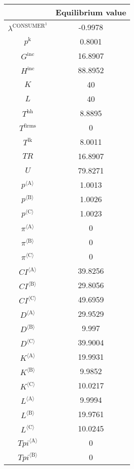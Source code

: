 \begin{tabular}{c|c|}
  & Equilibrium value\\
\hline
$\lambda^{\mathrm{CONSUMER}^{\mathrm{1}}}$ & -0.9978 \\
$p^{\mathrm{k}}$ & 0.8001 \\
$G^{\mathrm{inc}}$ & 16.8907 \\
$H^{\mathrm{inc}}$ & 88.8952 \\
$K$ & 40 \\
$L$ & 40 \\
$T^{\mathrm{hh}}$ & 8.8895 \\
$T^{\mathrm{firms}}$ & 0 \\
$T^{\mathrm{lk}}$ & 8.0011 \\
${T\!R}$ & 16.8907 \\
$U$ & 79.8271 \\
${p}^{\langle \mathrm{A}\rangle}$ & 1.0013 \\
${p}^{\langle \mathrm{B}\rangle}$ & 1.0026 \\
${p}^{\langle \mathrm{C}\rangle}$ & 1.0023 \\
${\pi}^{\langle \mathrm{A}\rangle}$ & 0 \\
${\pi}^{\langle \mathrm{B}\rangle}$ & 0 \\
${\pi}^{\langle \mathrm{C}\rangle}$ & 0 \\
${{C\!I}}^{\langle \mathrm{A}\rangle}$ & 39.8256 \\
${{C\!I}}^{\langle \mathrm{B}\rangle}$ & 29.8056 \\
${{C\!I}}^{\langle \mathrm{C}\rangle}$ & 49.6959 \\
${D}^{\langle \mathrm{A}\rangle}$ & 29.9529 \\
${D}^{\langle \mathrm{B}\rangle}$ & 9.997 \\
${D}^{\langle \mathrm{C}\rangle}$ & 39.9004 \\
${K}^{\langle \mathrm{A}\rangle}$ & 19.9931 \\
${K}^{\langle \mathrm{B}\rangle}$ & 9.9852 \\
${K}^{\langle \mathrm{C}\rangle}$ & 10.0217 \\
${L}^{\langle \mathrm{A}\rangle}$ & 9.9994 \\
${L}^{\langle \mathrm{B}\rangle}$ & 19.9761 \\
${L}^{\langle \mathrm{C}\rangle}$ & 10.0245 \\
${{T\!p\!i}}^{\langle \mathrm{A}\rangle}$ & 0 \\
${{T\!p\!i}}^{\langle \mathrm{B}\rangle}$ & 0 \\

\end{tabular}
